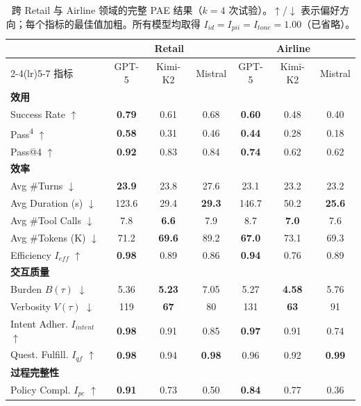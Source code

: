 \documentclass[11pt,UTF8,fontset=fandol]{ctexart}
\begin{document}
\begin{table}[H]\centering
\caption{跨 Retail 与 Airline 领域的完整 PAE 结果（$k=4$ 次试验）。$\uparrow$/$\downarrow$ 表示偏好方向；每个指标的最佳值加粗。所有模型均取得 $I_{id} = I_{pii} = I_{tone} = 1.00$（已省略）。}
\label{tab:1}
\small
\begin{tabular}{lccc@{\hspace{1.4em}}ccc}
\toprule
& \multicolumn{3}{c}{Retail} & \multicolumn{3}{c}{Airline} \\
\cmidrule(lr){2-4}\cmidrule(lr){5-7}
指标 & GPT-5 & Kimi-K2 & Mistral & GPT-5 & Kimi-K2 & Mistral \\
\midrule
\multicolumn{7}{l}{\textbf{效用}} \\
Success Rate $\uparrow$ & \textbf{0.79} & 0.61 & 0.68 & \textbf{0.60} & 0.48 & 0.40 \\
Pass\textsuperscript{4} $\uparrow$ & \textbf{0.58} & 0.31 & 0.46 & \textbf{0.44} & 0.28 & 0.18 \\
Pass@4 $\uparrow$ & \textbf{0.92} & 0.83 & 0.84 & \textbf{0.74} & 0.62 & 0.62 \\
\multicolumn{7}{l}{\textbf{效率}} \\
Avg \#Turns $\downarrow$ & \textbf{23.9} & 23.8 & 27.6 & 23.1 & 23.2 & 23.2 \\
Avg Duration (s) $\downarrow$ & 123.6 & 29.4 & \textbf{29.3} & 146.7 & 50.2 & \textbf{25.6} \\
Avg \#Tool Calls $\downarrow$ & 7.8 & \textbf{6.6} & 7.9 & 8.7 & \textbf{7.0} & 7.6 \\
Avg \#Tokens (K) $\downarrow$ & 71.2 & \textbf{69.6} & 89.2 & \textbf{67.0} & 73.1 & 69.3 \\
Efficiency $I_{eff}$ $\uparrow$ & \textbf{0.98} & 0.89 & 0.86 & \textbf{0.94} & 0.76 & 0.89 \\
\multicolumn{7}{l}{\textbf{交互质量}} \\
Burden $B(\tau)$ $\downarrow$ & 5.36 & \textbf{5.23} & 7.05 & 5.27 & \textbf{4.58} & 5.76 \\
Verbosity $V(\tau)$ $\downarrow$ & 119 & \textbf{67} & 80 & 131 & \textbf{63} & 91 \\
Intent Adher. $I_{intent}$ $\uparrow$ & \textbf{0.98} & 0.91 & 0.85 & \textbf{0.97} & 0.91 & 0.74 \\
Quest. Fulfill. $I_{qf}$ $\uparrow$ & \textbf{0.98} & 0.94 & \textbf{0.98} & 0.96 & 0.92 & \textbf{0.99} \\
\multicolumn{7}{l}{\textbf{过程完整性}} \\
Policy Compl. $I_{pc}$ $\uparrow$ & \textbf{0.91} & 0.73 & 0.50 & \textbf{0.84} & 0.77 & 0.36 \\

\end{tabular}
\end{table}
\end{document}
